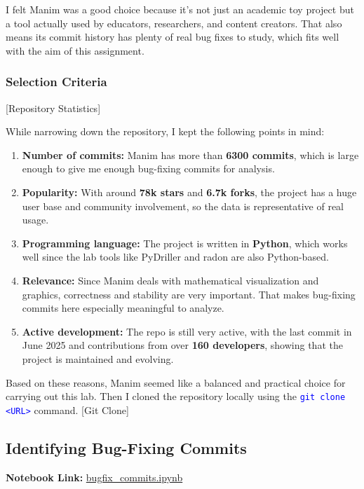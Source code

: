 \documentclass[10pt,a4paper]{report}
\newcommand{\command}[1]{\texttt{\textcolor{blue}{#1}}}
\begin{document}
I felt Manim was a good choice because it’s not just an academic toy project but a tool actually used by educators, researchers, and content creators. That also means its commit history has plenty of real bug fixes to study, which fits well with the aim of this assignment.

\subsubsection{Selection Criteria}
[Repository Statistics]

While narrowing down the repository, I kept the following points in mind:
\begin{enumerate}
    \item \textbf{Number of commits:} Manim has more than \textbf{6300 commits}, which is large enough to give me enough bug-fixing commits for analysis.
    \item \textbf{Popularity:} With around \textbf{78k stars} and \textbf{6.7k forks}, the project has a huge user base and community involvement, so the data is representative of real usage.
    \item \textbf{Programming language:} The project is written in \textbf{Python}, which works well since the lab tools like PyDriller and radon are also Python-based.
    \item \textbf{Relevance:} Since Manim deals with mathematical visualization and graphics, correctness and stability are very important. That makes bug-fixing commits here especially meaningful to analyze.
    \item \textbf{Active development:} The repo is still very active, with the last commit in June 2025 and contributions from over \textbf{160 developers}, showing that the project is maintained and evolving.
\end{enumerate}

Based on these reasons, Manim seemed like a balanced and practical choice for carrying out this lab. Then I cloned the repository locally using the \command{git clone <URL>} command.
[Git Clone]

\subsection{Identifying Bug-Fixing Commits}
\textbf{Notebook Link:} \href{https://github.com/ShardulJunagade/cs202-stt/blob/main/lab2/bugfix_commits.ipynb}{bugfix\_commits.ipynb}
\end{document}
